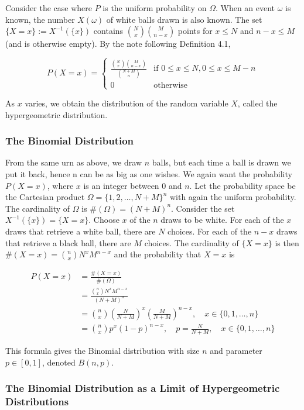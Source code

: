 \documentclass{article}
\begin{document}
{Consider the case where $P$ is the uniform probability on $\Omega$. When an event $\omega$ is known, the number $X(\omega)$ of white balls drawn is also known. The set $\{X = x\} := X^{-1}(\{x\})$ contains $\binom{N}{x}\binom{M}{n-x}$ points for $x \leq N$ and $n-x \leq M$ (and is otherwise empty). By the note following Definition 4.1, 

$$
P(X = x) = 
\begin{cases}
\frac{\binom{N}{x}\binom{M}{n-x}}{\binom{N+M}{n}} & \text{if } 0\leq x \leq N, 0\leq x \leq M-n \\
0 & \text{otherwise}
\end{cases}
$$

As $x$ varies, we obtain the distribution of the random variable $X$, called the hypergeometric distribution. 

\subsubsection*{The Binomial Distribution}

From the same urn as above, we draw $n$ balls, but each time a ball is drawn we put it back, hence n can be as big as one wishes. We again want the probability $P(X = x)$, where $x$ is an integer between 0 and $n$. Let the probability space be the Cartesian product $\Omega = \{1,2,\dots, N+M\}^n$ with again the uniform probability. The cardinality of $\Omega$ is $\#(\Omega) = (N+M)^n$. Consider the set $X^{-1}(\{x\}) = \{X = x\}$. Choose $x$ of the $n$ draws to be white. For each of the $x$ draws that retrieve a white ball, there are $N$ choices. For each of the $n-x$ draws that retrieve a black ball, there are $M$ choices. The cardinality of $\{X = x\}$ is then $\#(X = x) = \binom{n}{x}N^xM^{n-x}$ and the probability that $X = x$ is 

\begin{align*}
P(X = x)
&= \frac{\#(X = x)}{\#(\Omega)}\\
&= \frac{\binom{n}{x}N^xM^{n-x}}{(N+M)^n} \\
&= \binom{n}{x} \left(\frac{N}{N+M}\right)^x \left(\frac{M}{N+M}\right)^{n-x}, \quad x \in \{0,1,\dots, n\} \\
&= \binom{n}{x} p^x (1-p)^{n-x}, \quad p = \frac{N}{N+M},
\quad x \in \{0,1,\dots, n\}
\end{align*}

This formula gives the Binomial distribution with size $n$ and parameter $p \in [0,1]$, denoted $B(n,p)$. 

\subsubsection*{The Binomial Distribution as a Limit of Hypergeometric Distributions}

}
\end{document}
